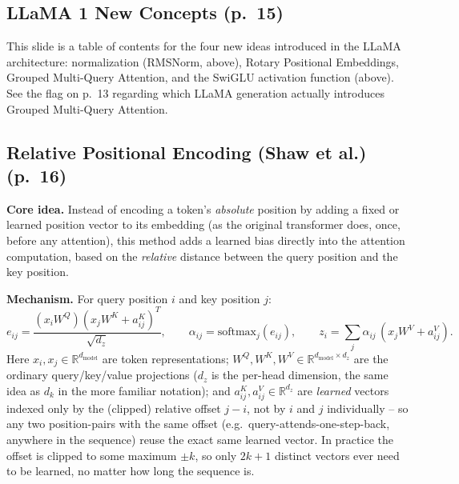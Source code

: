 \documentclass[11pt]{article}
\begin{document}
\subsection{LLaMA 1 New Concepts (p.\ 15)}

This slide is a table of contents for the four new ideas introduced in the LLaMA architecture: normalization (RMSNorm, above), Rotary Positional Embeddings, Grouped Multi-Query Attention, and the SwiGLU activation function (above). See the flag on p.\ 13 regarding which LLaMA generation actually introduces Grouped Multi-Query Attention.

\subsection{Relative Positional Encoding (Shaw et al.) (p.\ 16)}

\textbf{Core idea.} Instead of encoding a token's \emph{absolute} position by adding a fixed or learned position vector to its embedding (as the original transformer does, once, before any attention), this method adds a learned bias directly into the attention computation, based on the \emph{relative} distance between the query position and the key position.

\textbf{Mechanism.} For query position $i$ and key position $j$:
\[
e_{ij} = \frac{(x_i W^Q)(x_j W^K + a_{ij}^K)^T}{\sqrt{d_z}}, \qquad \alpha_{ij} = \text{softmax}_j(e_{ij}), \qquad z_i = \sum_j \alpha_{ij}\,(x_j W^V + a_{ij}^V).
\]
Here $x_i, x_j \in \mathbb{R}^{d_{\text{model}}}$ are token representations; $W^Q, W^K, W^V \in \mathbb{R}^{d_{\text{model}}\times d_z}$ are the ordinary query/key/value projections ($d_z$ is the per-head dimension, the same idea as $d_k$ in the more familiar notation); and $a_{ij}^K, a_{ij}^V \in \mathbb{R}^{d_z}$ are \emph{learned} vectors indexed only by the (clipped) relative offset $j-i$, not by $i$ and $j$ individually -- so any two position-pairs with the same offset (e.g.\ query-attends-one-step-back, anywhere in the sequence) reuse the exact same learned vector. In practice the offset is clipped to some maximum $\pm k$, so only $2k+1$ distinct vectors ever need to be learned, no matter how long the sequence is.
\end{document}
